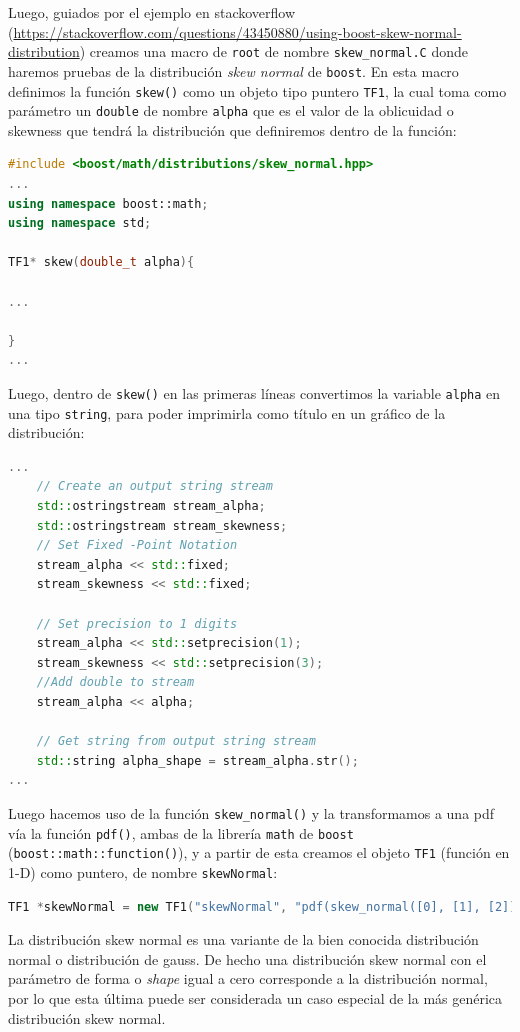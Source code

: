\documentclass[11pt,letterpaper]{article}
\begin{document}
Luego, guiados por el ejemplo en stackoverflow (\url{https://stackoverflow.com/questions/43450880/using-boost-skew-normal-distribution}) creamos una macro de \verb|root| de nombre \verb|skew_normal.C| donde haremos pruebas de la distribución  \textit{skew normal} de \verb|boost|. En esta macro definimos la función \verb|skew()| como un objeto tipo puntero \verb|TF1|, la cual toma como parámetro un \verb|double| de nombre \verb|alpha| que es el valor de la oblicuidad o skewness que tendrá la distribución que definiremos dentro de la función:

\begin{lstlisting}[language=c++]
#include <boost/math/distributions/skew_normal.hpp>
...
using namespace boost::math;
using namespace std;

TF1* skew(double_t alpha){

...

}
...
\end{lstlisting}

Luego, dentro de \verb|skew()| en las primeras líneas convertimos la variable \verb|alpha| en una tipo \verb|string|, para poder imprimirla como título en un gráfico de la distribución:

\begin{lstlisting}[language=c++]
...
	// Create an output string stream
	std::ostringstream stream_alpha;
	std::ostringstream stream_skewness;
	// Set Fixed -Point Notation
	stream_alpha << std::fixed;
	stream_skewness << std::fixed;
	
	// Set precision to 1 digits
	stream_alpha << std::setprecision(1);
	stream_skewness << std::setprecision(3);
	//Add double to stream
	stream_alpha << alpha;
	
	// Get string from output string stream
	std::string alpha_shape = stream_alpha.str();
...
\end{lstlisting}

Luego hacemos uso de la función \verb|skew_normal()| y la transformamos a una pdf vía la función \verb|pdf()|, ambas de la librería \verb|math| de \verb|boost| (\verb|boost::math::function()|), y a partir de esta creamos el objeto \verb|TF1| (función en 1-D) como puntero, de nombre \verb|skewNormal|:

\begin{lstlisting}[language=c++]
TF1 *skewNormal = new TF1("skewNormal", "pdf(skew_normal([0], [1], [2]), x)",0,7);
\end{lstlisting}\label{skew_normal_code_def}


La distribución skew normal es una variante de la bien conocida distribución normal o distribución de gauss. De hecho una distribución skew normal con el parámetro de forma o \textit{shape} igual a cero corresponde a la distribución normal, por lo que esta última puede ser considerada un caso especial de la más genérica distribución skew normal.
\end{document}
